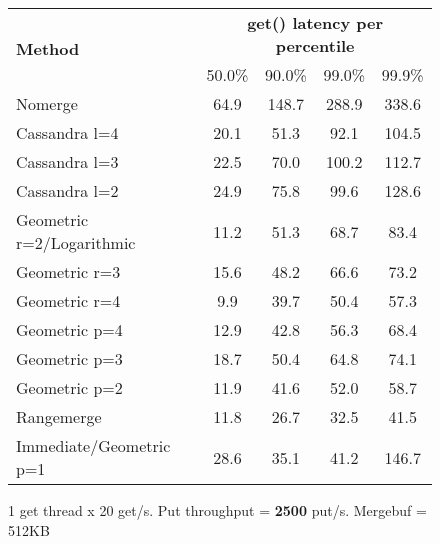 \documentclass[11pt]{article}
\begin{document}
\begin{figure}[h]
\begin{center}
\begin{tabular}{|l|c|c|c|c|}
\hline
\multirow{2}{*}{\textbf{Method}} & \multicolumn{4}{c|}{\textbf{get() latency per percentile}} \\
                                 & 50.0\% & 90.0\% & 99.0\% & 99.9\% \\
\hline
\hline
Nomerge                   &  64.9 & 148.7 & 288.9 & 338.6 \\
\hline
Cassandra l=4             &  20.1 &  51.3 &  92.1 & 104.5 \\
\hline
Cassandra l=3             &  22.5 &  70.0 & 100.2 & 112.7 \\
\hline
Cassandra l=2             &  24.9 &  75.8 &  99.6 & 128.6 \\
\hline
Geometric r=2/Logarithmic &  11.2 &  51.3 &  68.7 &  83.4 \\
\hline
Geometric r=3             &  15.6 &  48.2 &  66.6 &  73.2 \\
\hline
Geometric r=4             &   9.9 &  39.7 &  50.4 &  57.3 \\
\hline
Geometric p=4             &  12.9 &  42.8 &  56.3 &  68.4 \\
\hline
Geometric p=3             &  18.7 &  50.4 &  64.8 &  74.1 \\
\hline
Geometric p=2             &  11.9 &  41.6 &  52.0 &  58.7 \\
\hline
Rangemerge                &  11.8 &  26.7 &  32.5 &  41.5 \\
\hline
Immediate/Geometric p=1   &  28.6 &  35.1 &  41.2 & 146.7 \\
\hline
\end{tabular} 
\caption{1 get thread x 20 get/s. Put throughput = \textbf{2500} put/s. Mergebuf = 512KB}
\end{center}
\end{figure}
\end{document}
